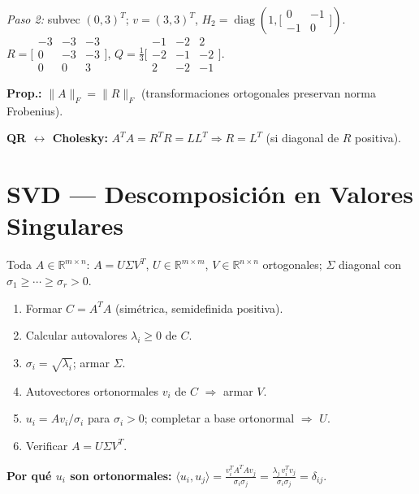 \documentclass[12pt,a4paper]{article}
\begin{document}
\textit{Paso 2:} subvec $(0,3)^T$; $v=(3,3)^T$, $H_2=\operatorname{diag}(1,\bigl[\begin{smallmatrix}0&-1\\-1&0\end{smallmatrix}\bigr])$.
$R=\bigl[\begin{smallmatrix}-3&-3&-3\\0&-3&-3\\0&0&3\end{smallmatrix}\bigr]$,
$Q=\tfrac{1}{3}\bigl[\begin{smallmatrix}-1&-2&2\\-2&-1&-2\\2&-2&-1\end{smallmatrix}\bigr]$. \checkmark

\textbf{Prop.:} $\|A\|_F=\|R\|_F$ (transformaciones ortogonales preservan norma Frobenius).

\textbf{QR $\leftrightarrow$ Cholesky:} $A^TA=R^TR=LL^T\Rightarrow R=L^T$ (si diagonal de $R$ positiva).

\section{SVD --- Descomposición en Valores Singulares}

Toda $A\in\mathbb{R}^{m\times n}$: $A=U\Sigma V^T$, $U\in\mathbb{R}^{m\times m}$, $V\in\mathbb{R}^{n\times n}$ ortogonales; $\Sigma$ diagonal con $\sigma_1\ge\cdots\ge\sigma_r>0$.

\begin{algoritmo}[title={Algoritmo SVD}]
\begin{enumerate}[noitemsep]
  \item Formar $C=A^TA$ (simétrica, semidefinida positiva).
  \item Calcular autovalores $\lambda_i\ge0$ de $C$.
  \item $\sigma_i=\sqrt{\lambda_i}$; armar $\Sigma$.
  \item Autovectores ortonormales $v_i$ de $C$ $\Rightarrow$ armar $V$.
  \item $u_i=Av_i/\sigma_i$ para $\sigma_i>0$; completar a base ortonormal $\Rightarrow$ $U$.
  \item Verificar $A=U\Sigma V^T$.
\end{enumerate}
\textbf{Por qué $u_i$ son ortonormales:}
$\langle u_i,u_j\rangle=\tfrac{v_i^TA^TAv_j}{\sigma_i\sigma_j}=\tfrac{\lambda_j\,v_i^Tv_j}{\sigma_i\sigma_j}=\delta_{ij}$.
\end{algoritmo}
\end{document}
